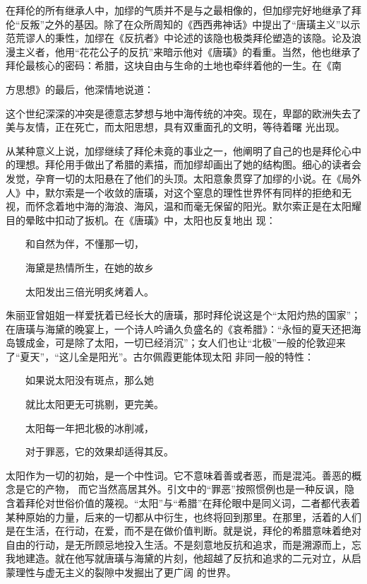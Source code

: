 \documentclass{article}
\begin{document}
在拜伦的所有继承人中，加缪的气质并不是与之最相像的，但加缪完好地继承了拜伦“反叛”之外的基因。除了在众所周知的《西西弗神话》中提出了“唐璜主义”以示范荒谬人的秉性，加缪在《反抗者》中论述的该隐也极类拜伦塑造的该隐。论及浪漫主义者，他用“花花公子的反抗”来暗示他对《唐璜》的看重。当然，他也继承了拜伦最核心的密码：希腊，这块自由与生命的土地也牵绊着他的一生。在《南
\newpage

方思想》的最后，他深情地说道： 

这个世纪深深的冲突是德意志梦想与地中海传统的冲突。现在，卑鄙的欧洲失去了美与友情，正在死亡，而太阳思想，具有双重面孔的文明，等待着曙
光出现。 

从某种意义上说，加缪继续了拜伦未竟的事业之一，他阐明了自己的也是拜伦心中的理想。拜伦用手做出了希腊的素描，而加缪却画出了她的结构图。细心的读者会发觉，孕育一切的太阳悬在了他们的头顶。太阳意象贯穿了加缪的小说。在《局外人》中，默尔索是一个收敛的唐璜，对这个窒息的理性世界怀有同样的拒绝和无视，而怀念着地中海的海浪、海风，温和而毫无保留的阳光。默尔索正是在太阳耀目的晕眩中扣动了扳机。在《唐璜》中，太阳也反复地出
现： 


　　和自然为伴，不懂那一切， 


\newpage

　　海黛是热情所生，在她的故乡 


　　太阳发出三倍光明炙烤着人。 

朱丽亚曾姐姐一样爱抚着已经长大的唐璜，那时拜伦说这是个“太阳灼热的国家”；在唐璜与海黛的晚宴上，一个诗人吟诵久负盛名的《哀希腊》：“永恒的夏天还把海岛镀成金，可是除了太阳，一切已经消沉”；女人们也让“北极”一般的伦敦迎来了“夏天”，“这儿全是阳光”。古尔佩霞更能体现太阳
非同一般的特性： 


　　如果说太阳没有斑点，那么她 


　　就比太阳更无可挑剔，更完美。 


　　太阳每一年把北极的冰削减， 


　　对于罪恶，它的效果却适得其反。 

太阳作为一切的初始，是一个中性词。它不意味着善或者恶，而是混沌。善恶的概念是它的产物，
\newpage
而它当然高居其外。引文中的“罪恶”按照惯例也是一种反讽，隐含着拜伦对世俗价值的蔑视。“太阳”与“希腊”在拜伦眼中是同义词，二者都代表着某种原始的力量，后来的一切都从中衍生，也终将回到那里。在那里，活着的人们是在生活，在行动，在爱，而不是在做价值判断。就是说，拜伦的希腊意味着绝对自由的行动，是无所顾忌地投入生活。不是刻意地反抗和追求，而是溯源而上，忘我地建造。就在他写就唐璜与海黛的片刻，他超越了反抗和追求的二元对立，从启蒙理性与虚无主义的裂隙中发掘出了更广阔
的世界。 
\end{document}
